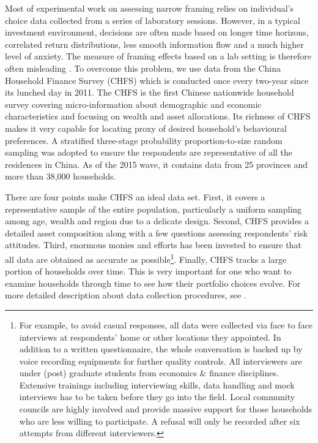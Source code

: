 \documentclass[ukenglish,nottitlepage,thmsb,11pt,letterpaper]{article}
\begin{document}
Most of experimental work on assessing narrow framing relies on individual's choice data collected from a series of laboratory sessions. However, in a typical investment environment, decisions are often made based on longer time horizons, correlated return distributions, less smooth information flow and a much higher level of anxiety. The measure of framing effects based on a lab setting is therefore often misleading \citep{Beshears2016}. To overcome this problem, we use data from the China Household Finance Survey (CHFS) which is conducted once every two-year since its lunched day in 2011. The CHFS is the first Chinese nationwide household survey covering micro-information about demographic and economic characteristics and focusing on wealth and asset allocations. Its richness of CHFS makes it very capable for locating proxy of desired household's behavioural preferences. A stratiﬁed three-stage probability proportion-to-size
random sampling was adopted to ensure the respondents are representative of all the residences in China. As of the 2015 wave, it contains data from 25 provinces and more than 38,000 households. 

There are four points make CHFS an ideal data set. First, it covers a representative sample of the entire population, particularly a uniform sampling among age, wealth and region due to a delicate design. Second, CHFS provides a detailed asset composition along with a few questions assessing respondents' risk attitudes. Third, enormous monies and efforts has been invested to ensure that all data are obtained as accurate as possible\footnote{For example, to avoid casual responses, all data were collected via face to face interviews at respondents' home or other locations they appointed. In addition to a written questionnaire, the whole conversation is backed up by voice recording equipments for further quality controls. All interviewers are under (post) graduate students from economics \& finance disciplines. Extensive trainings including interviewing skills, data handling and mock interviews has to be taken before they go into the field. Local community councils are highly involved and provide massive support for those households who are less willing to participate. A refusal will only be recorded after six attempts from different interviewers.}. Finally, CHFS tracks a large portion of households over time. This is very important for one who want to examine households through time to see how their portfolio choices evolve. For more detailed description about data collection procedures, see \citet{Gan2013}.
\end{document}
